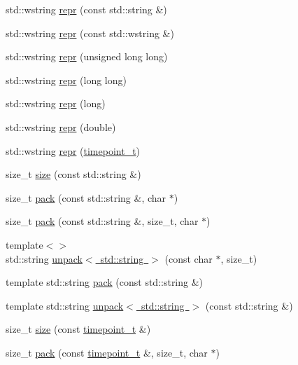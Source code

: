 \begin{DoxyCompactItemize}
\item 
std\+::wstring \mbox{\hyperlink{namespaceebml_a6021a6dce62f371d7ed989dc29be2599}{repr}} (const std\+::string \&)
\item 
std\+::wstring \mbox{\hyperlink{namespaceebml_a69e4c6909c8a7fc69edd32e99ec8a490}{repr}} (const std\+::wstring \&)
\item 
std\+::wstring \mbox{\hyperlink{namespaceebml_a82cacdcda15dab54cb129baca549eb2f}{repr}} (unsigned long long)
\item 
std\+::wstring \mbox{\hyperlink{namespaceebml_ae628d127f38ecd31687f54becab12c27}{repr}} (long long)
\item 
std\+::wstring \mbox{\hyperlink{namespaceebml_ace4ca5a87203afac26054d724b9be07d}{repr}} (long)
\item 
std\+::wstring \mbox{\hyperlink{namespaceebml_a2798ab93b716158ab4c4e796f7c9c97c}{repr}} (double)
\item 
std\+::wstring \mbox{\hyperlink{namespaceebml_a92c6b0cf4a3eef6a4b48746c0e43a3c1}{repr}} (\mbox{\hyperlink{namespaceebml_a7e667ec3fe8b51fb5b8f9690734d8638}{timepoint\+\_\+t}})
\item 
size\+\_\+t \mbox{\hyperlink{namespaceebml_a75eaf24de9c90584c60e27de3b1dd63e}{size}} (const std\+::string \&)
\item 
size\+\_\+t \mbox{\hyperlink{namespaceebml_a2ee8aa5ba5754b7c9e63da8fce0e413b}{pack}} (const std\+::string \&, char $\ast$)
\item 
size\+\_\+t \mbox{\hyperlink{namespaceebml_a436b47856669dd55e115bb9144e4e543}{pack}} (const std\+::string \&, size\+\_\+t, char $\ast$)
\item 
{\footnotesize template$<$$>$ }\\std\+::string \mbox{\hyperlink{namespaceebml_ad8250743a22e62d2cdee2b695870398e}{unpack$<$ std\+::string $>$}} (const char $\ast$, size\+\_\+t)
\item 
template std\+::string \mbox{\hyperlink{namespaceebml_a12db4cd27f116243759ded7e321b0a45}{pack}} (const std\+::string \&)
\item 
template std\+::string \mbox{\hyperlink{namespaceebml_a59216a04daa34cd404bdd97600ab1fe1}{unpack$<$ std\+::string $>$}} (const std\+::string \&)
\item 
size\+\_\+t \mbox{\hyperlink{namespaceebml_a95bc53481ddec59de86aa1ab7f8aae88}{size}} (const \mbox{\hyperlink{namespaceebml_a7e667ec3fe8b51fb5b8f9690734d8638}{timepoint\+\_\+t}} \&)
\item 
size\+\_\+t \mbox{\hyperlink{namespaceebml_a1878818f2cc11ea62ecab6513bc7e9d1}{pack}} (const \mbox{\hyperlink{namespaceebml_a7e667ec3fe8b51fb5b8f9690734d8638}{timepoint\+\_\+t}} \&, size\+\_\+t, char $\ast$)

\end{DoxyCompactItemize}
